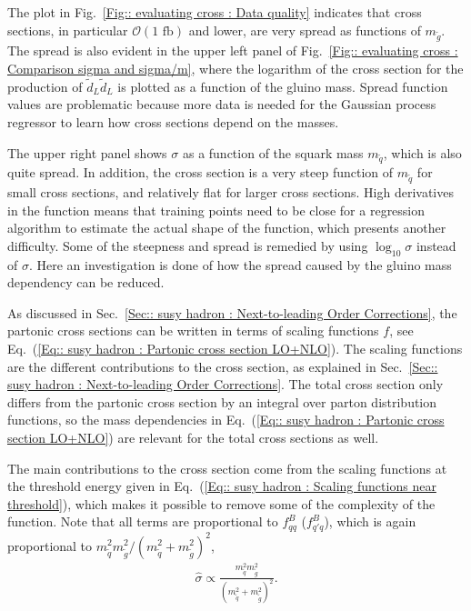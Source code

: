 \documentclass[twoside,english]{uiofysmaster}
\begin{document}
{{The plot in Fig.~\ref{Fig:: evaluating cross : Data quality} indicates that cross sections, in particular $\mathcal{O}(1 \text{ fb})$ and lower, are very spread as functions of $m_{\widetilde{g}}$. The spread is also evident in the upper left panel of Fig.~\ref{Fig:: evaluating cross : Comparison sigma and sigma/m}, where the logarithm of the cross section for the production of $\widetilde{d}_L \widetilde{d}_L$ is plotted as a function of the gluino mass. Spread function values are problematic because more data is needed for the Gaussian process regressor to learn how cross sections depend on the masses. 

The upper right panel shows $\sigma$ as a function of the squark mass $m_{\widetilde{q}}$, which is also quite spread. In addition, the cross section is a very steep function of $m_{\widetilde{q}}$ for small cross sections, and relatively flat for larger cross sections. High derivatives in the function means that training points need to be close for a regression algorithm to estimate the actual shape of the function, which presents another difficulty. Some of the steepness and spread is remedied by using $\log_{10} \sigma$ instead of $\sigma$. Here an investigation is done of how the spread caused by the gluino mass dependency can be reduced.


As discussed in Sec.~\ref{Sec:: susy hadron : Next-to-leading Order Corrections}, the partonic cross sections can be written in terms of scaling functions $f$, see Eq.~(\ref{Eq:: susy hadron : Partonic cross section LO+NLO}). The scaling functions are the different contributions to the cross section, as explained in Sec.~\ref{Sec:: susy hadron : Next-to-leading Order Corrections}. The total cross section only differs from the partonic cross section by an integral over parton distribution functions, so the mass dependencies in Eq.~(\ref{Eq:: susy hadron : Partonic cross section LO+NLO}) are relevant for the total cross sections as well.

The main contributions to the cross section come from the scaling functions at the threshold energy given in Eq.~(\ref{Eq:: susy hadron : Scaling functions near threshold}), which makes it possible to remove some of the complexity of the function. Note that all terms are proportional to $f_{qq}^B$ ($f_{q'q}^B$), which is again proportional to $m_{\widetilde{q}}^2 m_{\widetilde{g}}^2/(m_{\widetilde{q}}^2 +m_{\widetilde{g}}^2)^2$,
\begin{align}\label{Eq:: evaluating cross : mg mq dependency}
\hat{\sigma} \propto \frac{m_{\widetilde{q}}^2 m_{\widetilde{g}}^2}{(m_{\widetilde{q}}^2 +m_{\widetilde{g}}^2)^2}.
\end{align}

}}
\end{document}
